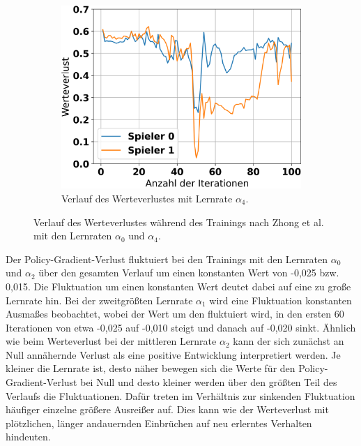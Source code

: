 \begin{figure}[ht!]
\begin{subfigure}[b]{0.32\textwidth}
		\includegraphics[width=\textwidth]{Bilder/ensemble-training/e_0_00001/graph_value_losses.png}
		\caption{Verlauf des Werteverlustes mit Lernrate $\alpha_4$.}
		\label{fig:f15}
	\end{subfigure}
	\caption{Verlauf des Werteverlustes während des Trainings nach Zhong et al. mit den Lernraten $\alpha_0$ und $\alpha_4$.}
\end{figure}

Der Policy-Gradient-Verlust fluktuiert bei den Trainings mit den Lernraten $\alpha_0$ und $\alpha_2$ über den gesamten Verlauf um einen konstanten Wert von -0,025 bzw. 0,015. Die Fluktuation um einen konstanten Wert deutet dabei auf eine zu große Lernrate hin. Bei der zweitgrößten Lernrate $\alpha_1$ wird eine Fluktuation konstanten Ausmaßes beobachtet, wobei der Wert um den fluktuiert wird, in den ersten 60 Iterationen von etwa -0,025 auf -0,010 steigt und danach auf -0,020 sinkt. Ähnlich wie beim Werteverlust bei der mittleren Lernrate $\alpha_2$ kann der sich zunächst an Null annähernde Verlust als eine positive Entwicklung interpretiert werden. Je kleiner die Lernrate ist, desto näher bewegen sich die Werte für den Policy-Gradient-Verlust bei Null und desto kleiner werden über den größten Teil des Verlaufs die Fluktuationen. Dafür treten im Verhältnis zur sinkenden Fluktuation häufiger einzelne größere Ausreißer auf. Dies kann wie der Werteverlust mit plötzlichen, länger andauernden Einbrüchen auf neu erlerntes Verhalten hindeuten.

